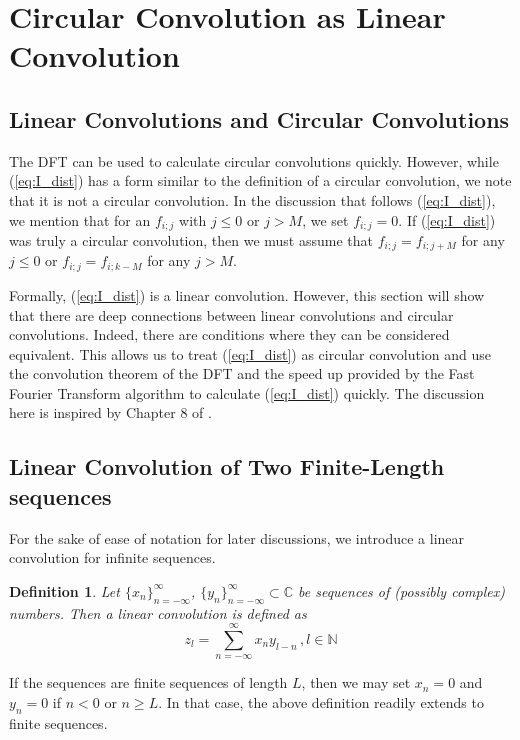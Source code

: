 \documentclass[12pt]{CSUNthesis}
\newtheorem{definition}{Definition}
\begin{document}
\section{Circular Convolution as Linear Convolution}
\subsection{Linear Convolutions and Circular Convolutions}
The DFT can be used to calculate circular convolutions quickly. However, while (\ref{eq:I_dist}) has a form similar to the definition of a circular convolution, we note that it is not a circular convolution. In the discussion that follows (\ref{eq:I_dist}), we mention that for an $f_{i;j}$ with $j \leq 0$ or $j > M$, we set $f_{i;j}=0$. If (\ref{eq:I_dist}) was truly a circular convolution, then we must assume that $f_{i;j}=f_{i;j+M}$ for any $j \leq 0$ or $f_{i;j}=f_{i;k-M}$ for any $j > M$. 

Formally, (\ref{eq:I_dist}) is a linear convolution. However, this section will show that there are deep connections between linear convolutions and circular convolutions. Indeed, there are conditions where they can be considered equivalent. This allows us to treat (\ref{eq:I_dist}) as circular convolution and use the convolution theorem of the DFT and the speed up provided by the Fast Fourier Transform algorithm to calculate (\ref{eq:I_dist}) quickly. The discussion here is inspired by Chapter 8 of \cite{Oppenheimer1999}.

\subsection{Linear Convolution of Two Finite-Length sequences}
\label{sec:lin_conv_fin_seq}
For the sake of ease of notation for later discussions, we introduce a linear convolution for infinite sequences. 
\begin{definition}
Let $\{x_n\}_{n=-\infty}^{\infty}$, $\{y_n\}_{n=-\infty}^{\infty} \subset \mathbb{C}$ be sequences of (possibly complex) numbers. Then a linear convolution is defined as 
\begin{equation}
\label{eq:lin_conv}
z_{l}=\sum_{n=-\infty}^{\infty} x_{n}y_{l-n}\, , l \in \mathbb{N}
\end{equation}
\end{definition}


If the sequences are finite sequences of length $L$, then we may set $x_n=0$ and $y_n=0$ if $n<0$ or $n \geq L$. In that case, the above definition readily extends to finite sequences.
\end{document}
